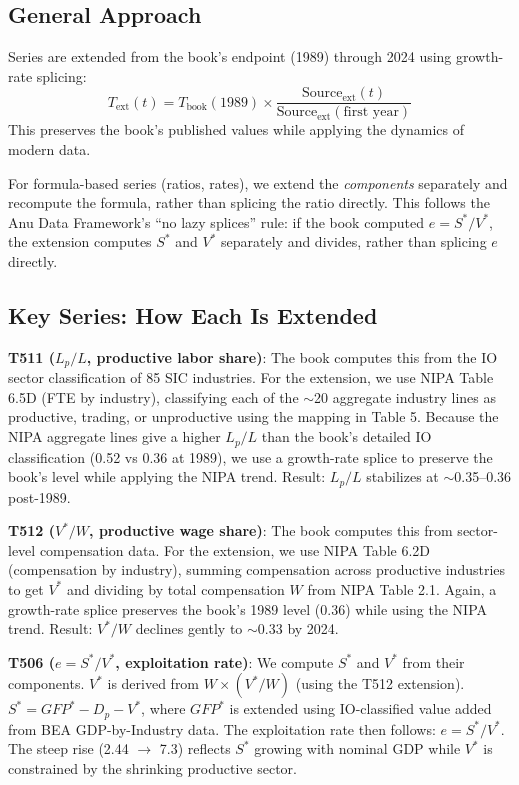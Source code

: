 \documentclass[12pt,a4paper]{article}
\begin{document}
\subsection{General Approach}

Series are extended from the book's endpoint (1989) through 2024 using growth-rate splicing:
\[
T_{\text{ext}}(t) = T_{\text{book}}(1989) \times \frac{\text{Source}_{\text{ext}}(t)}{\text{Source}_{\text{ext}}(\text{first year})}
\]
This preserves the book's published values while applying the dynamics of modern data.

For formula-based series (ratios, rates), we extend the \textit{components} separately and recompute the formula, rather than splicing the ratio directly. This follows the Anu Data Framework's ``no lazy splices'' rule: if the book computed $e = S^*/V^*$, the extension computes $S^*$ and $V^*$ separately and divides, rather than splicing $e$ directly.

\subsection{Key Series: How Each Is Extended}

\textbf{T511 ($L_p/L$, productive labor share)}: The book computes this from the IO sector classification of 85 SIC industries. For the extension, we use NIPA Table 6.5D (FTE by industry), classifying each of the $\sim$20 aggregate industry lines as productive, trading, or unproductive using the mapping in Table 5. Because the NIPA aggregate lines give a higher $L_p/L$ than the book's detailed IO classification (0.52 vs 0.36 at 1989), we use a growth-rate splice to preserve the book's level while applying the NIPA trend. Result: $L_p/L$ stabilizes at $\sim$0.35--0.36 post-1989.

\textbf{T512 ($V^*/W$, productive wage share)}: The book computes this from sector-level compensation data. For the extension, we use NIPA Table 6.2D (compensation by industry), summing compensation across productive industries to get $V^*$ and dividing by total compensation $W$ from NIPA Table 2.1. Again, a growth-rate splice preserves the book's 1989 level (0.36) while using the NIPA trend. Result: $V^*/W$ declines gently to $\sim$0.33 by 2024.

\textbf{T506 ($e = S^*/V^*$, exploitation rate)}: We compute $S^*$ and $V^*$ from their components. $V^*$ is derived from $W \times (V^*/W)$ (using the T512 extension). $S^* = GFP^* - D_p - V^*$, where $GFP^*$ is extended using IO-classified value added from BEA GDP-by-Industry data. The exploitation rate then follows: $e = S^*/V^*$. The steep rise (2.44 $\rightarrow$ 7.3) reflects $S^*$ growing with nominal GDP while $V^*$ is constrained by the shrinking productive sector.
\end{document}

